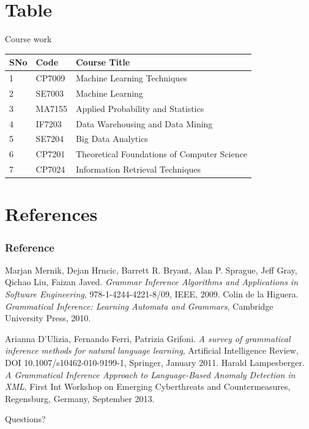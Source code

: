 \documentclass[11pt]{beamer}
\begin{document}
\section{Table}

\begin{frame}{Course work}

  \begin{tabular}{lll}
    SNo & Code & Course Title\\\hline
    1 & CP7009 & Machine Learning Techniques\\
    2 & SE7003 & Machine Learning\\
    3 & MA7155 & Applied Probability and Statistics \\    
    4 & IF7203 & Data Warehousing and Data Mining \\
    5 & SE7204 & Big Data Analytics\\
    6 & CP7201 & Theoretical Foundations  of Computer Science\\
    7 & CP7024 & Information Retrieval Techniques \\
  \end{tabular} 
\end{frame}

\section{References}

\begin{frame}[allowframebreaks]
  \frametitle<presentation>{Reference}
  \small
  \begin{thebibliography}{10}
    \beamertemplatebookbibitems
   Marjan Mernik, Dejan Hrncic, Barrett R. Bryant,
    Alan P. Sprague, Jeff Gray, Qichao Liu, Faizan Javed.
    \emph{Grammar Inference Algorithms and Applications in Software
      Engineering}, 978-1-4244-4221-8/09, IEEE, 2009.
   Colin de la Higuera.
    \emph{Grammatical Inference: Learning Automata and Grammars},
    Cambridge University Press, 2010.
 
    \beamertemplatearticlebibitems

   Arianna D'Ulizia, Fernando Ferri, Patrizia
    Grifoni.
    \emph{A survey of grammatical inference methods for natural
      language learning},
    Artificial Intelligence Review, DOI 10.1007/s10462-010-9199-1,
    Springer, January 2011.
   Harald Lampesberger. 
    \emph{A Grammatical Inference Approach to Language-Based Anomaly
      Detection in XML},
    First Int Workshop on Emerging Cyberthreats and Countermeasures,
    Regensburg, Germany, September 2013.
  \end{thebibliography}
\end{frame}

\begin{frame}
  \vfill
  \begin{center}
    Questions?
  \end{center}
  \vfill
\end{frame}
\end{document}
